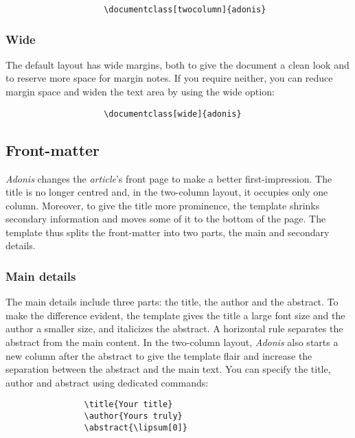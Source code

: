 \documentclass{adonis}
\begin{document}
				\begin{verbatim}
					\documentclass[twocolumn]{adonis}
				\end{verbatim}
			
			\subsubsection{Wide}
			
				The default layout has wide margins, both to give the document a clean look and to reserve more space for margin notes.
				If you require neither, you can reduce margin space and widen the text area by using the wide option:
			
				\begin{verbatim}
					\documentclass[wide]{adonis}
				\end{verbatim}
	
		\subsection{Front-matter}
		
			\textit{Adonis} changes the \textit{article}'s front page to make a better first-impression.
			The title is no longer centred and, in the two-column layout, it occupies only one column.
			Moreover, to give the title more prominence, the template shrinks secondary information and moves some of it to the bottom of the page.
			The template thus splits the front-matter into two parts, the main and secondary details.
			
			\subsubsection{Main details}
			
			The main details include three parts: the title, the author and the abstract.
			To make the difference evident, the template gives the title a large font size and the author a smaller size, and italicizes the abstract.
			A horizontal rule separates the abstract from the main content.
			In the two-column layout, \textit{Adonis} also starts a new column after the abstract to give the template flair and increase the separation between the abstract and the main text.
			You can specify the title, author and abstract using dedicated commands:
			
			\begin{verbatim}
				\title{Your title}
				\author{Yours truly}
				\abstract{\lipsum[0]}
			\end{verbatim}
			
\end{document}
